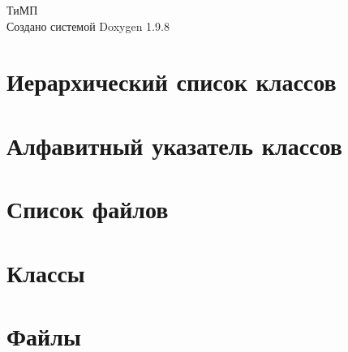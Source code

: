 \documentclass[twoside]{book}
\newcommand{\+}{\discretionary{\mbox{\scriptsize$\hookleftarrow$}}{}{}}
\newcommand{\clearemptydoublepage}{%
    \newpage{\pagestyle{empty}\cleardoublepage}%
  }
\begin{document}
  \raggedbottom
    \hypersetup{pageanchor=false,
                bookmarksnumbered=true,
                pdfencoding=unicode
               }
  \begin{titlepage}
  \vspace*{7cm}
  \begin{center}%
  {\Large ТиМП}\\
  \vspace*{1cm}
  {\large Создано системой Doxygen 1.9.8}\\
  \end{center}
  \end{titlepage}
  \clearemptydoublepage
  \tableofcontents
  \clearemptydoublepage
  \hypersetup{pageanchor=true}
\chapter{Иерархический список классов}

\chapter{Алфавитный указатель классов}

\chapter{Список файлов}

\chapter{Классы}




\chapter{Файлы}














  \backmatter
  \newpage
  \clearemptydoublepage
  \printindex
\end{document}
